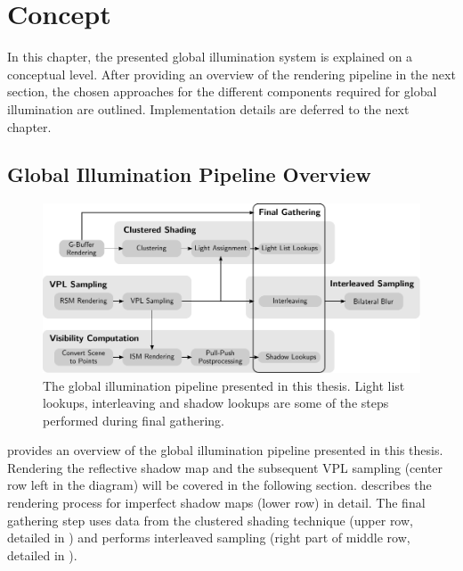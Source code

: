
\chapter{Concept}
\label{chap:concept}

In this chapter, the presented global illumination system is explained on a conceptual level. After providing an overview of the rendering pipeline in the next section, the chosen approaches for the different components required for global illumination are outlined. Implementation details are deferred to the next chapter.

\section{Global Illumination Pipeline Overview}
\label{sec:concept:overview}

\vspace{-5pt}

\begin{figure}[h]
    \includegraphics[width=\textwidth]{graphics/GI_pipeline_concept}
    \caption{The global illumination pipeline presented in this thesis. Light list lookups, interleaving and shadow lookups are some of the steps performed during final gathering.}
    \label{fig:GIPipelineConcept}
\end{figure}


 provides an overview of the global illumination pipeline presented in this thesis.
Rendering the reflective shadow map and the subsequent VPL sampling (center row left in the diagram) will be covered in the following section.
 describes the rendering process for imperfect shadow maps (lower row) in detail.
The final gathering step uses data from the clustered shading technique (upper row, detailed in ) and performs interleaved sampling (right part of middle row, detailed in ).

